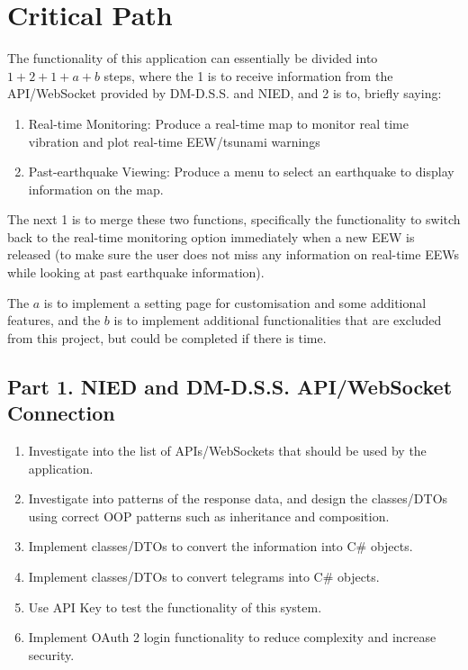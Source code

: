 \section{Critical Path}

The functionality of this application can essentially be divided into \(1+2+1+a+b\) steps, where the 1 is to receive information from the API/WebSocket provided by DM-D.S.S. and NIED, and 2 is to, briefly saying:
\begin{enumerate}
    \item Real-time Monitoring: Produce a real-time map to monitor real time vibration and plot real-time EEW/tsunami warnings
    \item Past-earthquake Viewing: Produce a menu to select an earthquake to display information on the map.
\end{enumerate}

The next 1 is to merge these two functions, specifically the functionality to switch back to the real-time monitoring option immediately when a new EEW is released (to make sure the user does not miss any information on real-time EEWs while looking at past earthquake information).

The \(a\) is to implement a setting page for customisation and some additional features, and the \(b\) is to implement additional functionalities that are excluded from this project, but could be completed if there is time.

\subsection{Part 1. NIED and DM-D.S.S. API/WebSocket Connection}
\begin{enumerate}
    \item Investigate into the list of APIs/WebSockets that should be used by the application.
    \item Investigate into patterns of the response data, and design the classes/DTOs using correct OOP patterns such as inheritance and composition.
    \item Implement classes/DTOs to convert the information into C\# objects.
    \item Implement classes/DTOs to convert telegrams into C\# objects.
    \item Use API Key to test the functionality of this system.
    \item Implement OAuth 2 login functionality to reduce complexity and increase security.
\end{enumerate}

